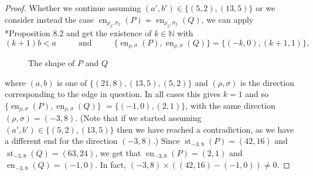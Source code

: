 \documentclass[reqno,a4paper,twoside]{amsart}
\theoremstyle{definition}
\theoremstyle{remark}
\DeclareMathOperator{\en}{en}
\DeclareMathOperator{\st}{st}
\begin{document}
\begin{proof}
	Whether we continue assuming $(a',b') \in \{ (5,2), (13,5) \}$ or we consider instead the case $\en_{\rho_2,\sigma_2}(P) \not \sim \en_{\rho_2,\sigma_2}(Q)$, we can apply \cite{GGV1}*{Proposition 8.2} and get the existence of $k \in \mathbb{N}$ with
	\[
		(k+1)b < a \hspace{1cm} \text{ and } \hspace{1cm} \{\en_{\rho,\sigma}(P), \en_{\rho,\sigma}(Q)\} = \{(-k,0), (k+1,1) \},
	\]

\begin{figure}[htb]
\centering
{}
\caption{The shape of $P$ and $Q$}
\end{figure}

	where $(a,b)$ is one of $\{(21,8), (13,5), (5,2)\}$ and $(\rho,\sigma)$ is the direction corresponding to the edge in question.
In all cases this gives $k = 1$ and so  $\{\en_{\rho,\sigma}(P), \en_{\rho,\sigma}(Q)\}$ $= \{(-1,0), (2,1) \}$, with the same direction
$(\rho, \sigma) = (-3,8)$. (Note that if we started assuming $(a',b') \in \{(5,2), (13,5)\}$ then we have reached a contradiction, as we have a
different end for the direction $(-3,8)$.) Since $\st_{-3,8}(P) = (42,16)$ and $\st_{-3,8}(Q) = (63,24)$, we get that $\en_{-3,8}(P) = (2,1)$ and
$\en_{-3,8}(Q) = (-1,0)$. In fact, $(-3,8) \times ((42,16)-(-1,0)) \neq 0$.
	

\end{proof}
\end{document}
